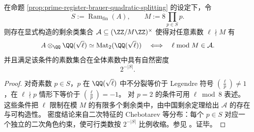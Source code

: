 \begin{corollary}\label{cor:prime-register-brauer-congruence-sieve-density}
在命题 \ref{prop:prime-register-brauer-quadratic-splitting} 的设定下，令
\[
S:=\operatorname{Ram}_{\mathrm{fin}}(A),\qquad
M:=8\prod_{p\in S}p.
\]
则存在显式构造的剩余类集合 \(\mathcal{A}\subseteq(\ZZ/M\ZZ)^{\times}\) 使得对任意素数 \(\ell\nmid M\) 有
\[
A\otimes_{\QQ}\QQ(\sqrt{\ell})\simeq \mathrm{Mat}_2(\QQ(\sqrt{\ell}))
\quad\Longleftrightarrow\quad
\ell\bmod M\in \mathcal{A}.
\]
并且满足该条件的素数集合在全体素数中具有自然密度
\[
2^{-|S|}.
\]
\end{corollary}
\begin{proof}
对奇素数 \(p\in S\)，\(p\) 在 \(\QQ(\sqrt{\ell})\) 中不分裂等价于 Legendre 符号 \(\left(\frac{\ell}{p}\right)\neq 1\)，在 \(\ell\nmid p\) 情形下等价于 \(\left(\frac{\ell}{p}\right)=-1\)。
对 \(p=2\) 的条件可用 \(\ell\bmod 8\) 表述。
这些条件把 \(\ell\) 限制在模 \(M\) 的有限多个剩余类中，由中国剩余定理给出 \(\mathcal{A}\) 的存在与可构造性。
密度结论来自二次特征的 Chebotarev 等分布：每个 \(p\in S\) 对应一个独立的二次角色约束，使可行类数按 \(2^{-|S|}\) 比例收缩。参见 \cite[Chapter~6]{Skorobogatov2001TorsorsRationalPoints}。证毕。
\end{proof}

